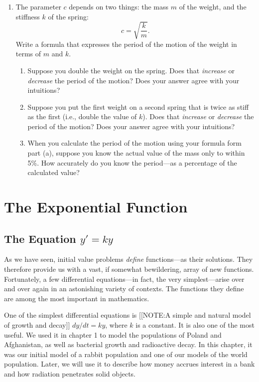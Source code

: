 \begin{enumerate}
\begin{enumerate}
\end{enumerate}
\item The parameter $c$ depends on two things: the mass $m$ of the
weight, and the stiffness $k$ of the spring:
	\[
c = \sqrt{\dfrac{k}{m}}.
\]
Write a formula that expresses the period of the motion of the weight in terms of $m$ and $k$.

  \begin{enumerate}
  \item Suppose you double the weight on the spring.  Does that {\em
  increase\/} or {\em decrease\/} the period of the motion?  Does your
answer agree with your intuitions?

  \item Suppose you put the first weight on a second spring that is twice
as stiff as the first (i.e., double the value of $k$).  Does that {\em
  increase\/} or {\em decrease\/} the period of the motion?  Does your
answer agree with your intuitions?

  \item When you calculate the period of the motion using your formula
form part (a), suppose you know the actual value of the mass only to
within 5\%.  How accurately do you know the period---as a percentage
of the calculated value?
\label{spring-end}


\end{enumerate}
\end{enumerate}
\section{The Exponential Function}
\label{sec:the-exponential-function}

\subsection{The Equation $y'= ky$}
\label{subsec:the-equation-y-ky}

As we have seen, initial value problems {\em define\/} functions---as
their solutions.  They therefore provide us with a vast, if somewhat
bewildering, array of new functions.  Fortunately, a few differential
equations---in fact, the very simplest---arise over and over again in
an astonishing variety of contexts.  The functions they define are
among the most important in mathematics.

One of the simplest differential equations is 
[[NOTE:A simple and  natural model of  growth and decay]]
$dy/dt =ky$, where $k$ is a constant.  It is also one of the most
useful.  We used it in chapter 1 to model the populations of Poland
and Afghanistan, as well as bacterial growth and radioactive decay.
In this chapter, it was our initial model of a rabbit population and
one of our models of the world population.  Later, we will use it to
describe how money accrues interest in a bank and how radiation
penetrates solid objects.

